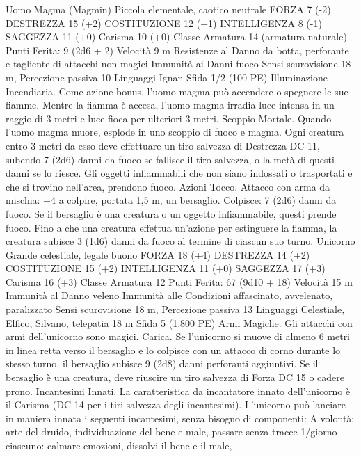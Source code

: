 \begin{multicols}{2}
Uomo Magma
(Magmin)
Piccola elementale, caotico neutrale
FORZA 7 (-2)
DESTREZZA 15 (+2)
COSTITUZIONE 12 (+1)
INTELLIGENZA 8 (-1)
SAGGEZZA 11 (+0)
Carisma 10 (+0)
Classe Armatura 14 (armatura naturale)
\hspace*{0pt}\hfill{Punti Ferita}: 9 (2d6 + 2)
Velocità 9 m
Resistenze al Danno da botta, perforante e tagliente di
attacchi non magici
Immunità ai Danni fuoco
Sensi scurovisione 18 m, Percezione passiva 10
Linguaggi Ignan
Sfida 1/2 (100 PE)
Illuminazione Incendiaria. Come azione bonus, l’uomo magma
può accendere o spegnere le sue fiamme. Mentre la fiamma è
accesa, l’uomo magma irradia luce intensa in un raggio di 3
metri e luce fioca per ulteriori 3 metri.
Scoppio Mortale. Quando l’uomo magma muore, esplode in uno
scoppio di fuoco e magma. Ogni creatura entro 3 metri da esso
deve effettuare un tiro salvezza di Destrezza DC 11, subendo 7
(2d6) danni da fuoco se fallisce il tiro salvezza, o la metà di
questi danni se lo riesce. Gli oggetti infiammabili che non siano
indossati o trasportati e che si trovino nell’area, prendono fuoco.
Azioni
Tocco. Attacco con arma da mischia: +4 a colpire, portata 1,5 m,
un bersaglio.
Colpisce: 7 (2d6) danni da fuoco. Se il bersaglio è una creatura o
un oggetto infiammabile, questi prende fuoco. Fino a che una
creatura effettua un’azione per estinguere la fiamma, la creatura
subisce 3 (1d6) danni da fuoco al termine di ciascun suo turno.
Unicorno
Grande celestiale, legale buono
FORZA 18 (+4)
DESTREZZA 14 (+2)
COSTITUZIONE 15 (+2)
INTELLIGENZA 11 (+0)
SAGGEZZA 17 (+3)
Carisma 16 (+3)
Classe Armatura 12
\hspace*{0pt}\hfill{Punti Ferita}: 67 (9d10 + 18)
Velocità 15 m
Immunità al Danno veleno
Immunità alle Condizioni affascinato, avvelenato, paralizzato
Sensi scurovisione 18 m, Percezione passiva 13
Linguaggi Celestiale, Elfico, Silvano, telepatia 18 m
Sfida 5 (1.800 PE)
Armi Magiche. Gli attacchi con armi dell’unicorno sono magici.
Carica. Se l’unicorno si muove di almeno 6 metri in linea retta
verso il bersaglio e lo colpisce con un attacco di corno durante lo
stesso turno, il bersaglio subisce 9 (2d8) danni perforanti
aggiuntivi. Se il bersaglio è una creatura, deve riuscire un tiro
salvezza di Forza DC 15 o cadere prono.
Incantesimi Innati. La caratteristica da incantatore innato
dell’unicorno è il Carisma (DC 14 per i tiri salvezza degli
incantesimi). L’unicorno può lanciare in maniera innata i
seguenti incantesimi, senza bisogno di componenti:
A volontà: arte del druido, individuazione del bene e male,
passare senza tracce
1/giorno ciascuno: calmare emozioni, dissolvi il bene e il male,

\end{multicols}
